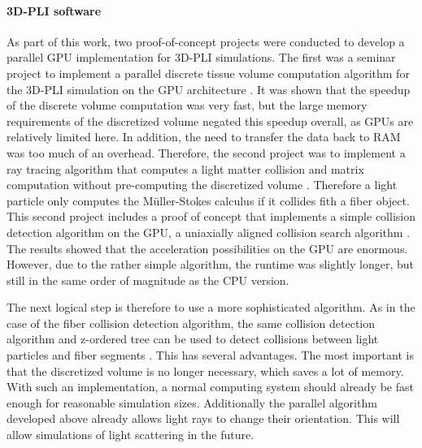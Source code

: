 \paragraph{\ac{3D-PLI} software}
% 
As part of this work, two proof-of-concept projects were conducted to develop a parallel GPU implementation for \ac{3D-PLI} simulations.
The first was a seminar project to implement a parallel discrete tissue volume computation algorithm for the \ac{3D-PLI} simulation on the \ac{GPU} architecture \cite{Kobusch:Seminar}.
It was shown that the speedup of the discrete volume computation was very fast, but the large memory requirements of the discretized volume negated this speedup overall, as \acp{GPU} are relatively limited here.
In addition, the need to transfer the data back to \ac{RAM} was too much of an overhead.
Therefore, the second project was to implement a ray tracing algorithm that computes a light matter collision and matrix computation without pre-computing the discretized volume \cite{Kobusch:887783}.
Therefore a light particle only computes the M\"{u}ller-Stokes calculus if it collides fith a fiber object.
This second project includes a proof of concept that implements a simple collision detection algorithm on the \ac{GPU}, a uniaxially aligned collision search algorithm \cite{Karras2012}.
The results showed that the acceleration possibilities on the \ac{GPU} are enormous.
However, due to the rather simple algorithm, the runtime was slightly longer, but still in the same order of magnitude as the \ac{CPU} version.
\par
% 
The next logical step is therefore to use a more sophisticated algorithm.
As in the case of the fiber collision detection algorithm, the same collision detection algorithm and z-ordered tree can be used to detect collisions between light particles and fiber segments \cite{Karras2012}.
This has several advantages.
The most important is that the discretized volume is no longer necessary, which saves a lot of memory.
With such an implementation, a normal computing system should already be fast enough for reasonable simulation sizes.
Additionally the parallel algorithm developed above already allows light rays to change their orientation.
This will allow simulations of light scattering in the future.
% 
% 
% 
